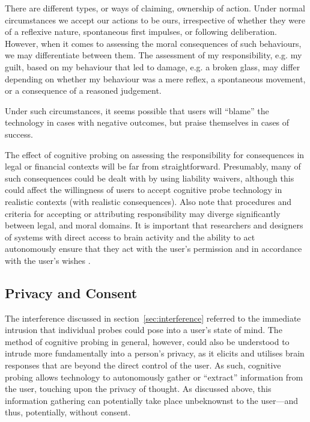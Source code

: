 There are different types, or ways of claiming, ownership of action. Under normal circumstances we accept our actions to be ours, irrespective of whether they were of a reflexive nature, spontaneous first impulses, or following deliberation. However, when it comes to assessing the moral consequences of such behaviours, we may differentiate between them. The assessment of my responsibility, e.g. my guilt, based on my behaviour that led to damage, e.g. a broken glass, may differ depending on whether my behaviour was a mere reflex, a spontaneous movement, or a consequence of a reasoned judgement.

Under such circumstances, it seems possible that users will ``blame'' the technology in cases with negative outcomes, but praise themselves in cases of success. 

The effect of cognitive probing on assessing the responsibility for consequences in legal or financial contexts will be far from straightforward. Presumably, many of such consequences could be dealt with by using liability waivers, although this could affect the willingness of users to accept cognitive probe technology in realistic contexts (with realistic consequences). Also note that procedures and criteria for accepting or attributing responsibility may diverge significantly between legal, and moral domains. It is important that researchers and designers of systems with direct access to brain activity and the ability to act autonomously ensure that they act with the user's permission and in accordance with the user's wishes \cite{fairclough2009fundamentals,mecacci2019criteria}. 


\subsection{Privacy and Consent}
\label{sec:privacy}

The interference discussed in section~\ref{sec:interference} referred to the immediate intrusion that individual probes could pose into a user's state of mind. The method of cognitive probing in general, however, could also be understood to intrude more fundamentally into a person's privacy, as it elicits and utilises brain responses that are beyond the direct control of the user. As such, cognitive probing allows technology to autonomously gather or ``extract'' information from the user, touching upon the privacy of thought. As discussed above, this information gathering can potentially take place unbeknownst to the user---and thus, potentially, without consent. 


